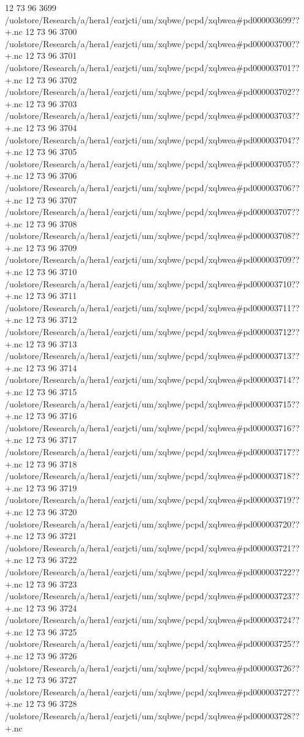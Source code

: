12 73 96
3699
/uolstore/Research/a/hera1/earjcti/um/xqbwe/pcpd/xqbwea#pd000003699??+.nc
12 73 96
3700
/uolstore/Research/a/hera1/earjcti/um/xqbwe/pcpd/xqbwea#pd000003700??+.nc
12 73 96
3701
/uolstore/Research/a/hera1/earjcti/um/xqbwe/pcpd/xqbwea#pd000003701??+.nc
12 73 96
3702
/uolstore/Research/a/hera1/earjcti/um/xqbwe/pcpd/xqbwea#pd000003702??+.nc
12 73 96
3703
/uolstore/Research/a/hera1/earjcti/um/xqbwe/pcpd/xqbwea#pd000003703??+.nc
12 73 96
3704
/uolstore/Research/a/hera1/earjcti/um/xqbwe/pcpd/xqbwea#pd000003704??+.nc
12 73 96
3705
/uolstore/Research/a/hera1/earjcti/um/xqbwe/pcpd/xqbwea#pd000003705??+.nc
12 73 96
3706
/uolstore/Research/a/hera1/earjcti/um/xqbwe/pcpd/xqbwea#pd000003706??+.nc
12 73 96
3707
/uolstore/Research/a/hera1/earjcti/um/xqbwe/pcpd/xqbwea#pd000003707??+.nc
12 73 96
3708
/uolstore/Research/a/hera1/earjcti/um/xqbwe/pcpd/xqbwea#pd000003708??+.nc
12 73 96
3709
/uolstore/Research/a/hera1/earjcti/um/xqbwe/pcpd/xqbwea#pd000003709??+.nc
12 73 96
3710
/uolstore/Research/a/hera1/earjcti/um/xqbwe/pcpd/xqbwea#pd000003710??+.nc
12 73 96
3711
/uolstore/Research/a/hera1/earjcti/um/xqbwe/pcpd/xqbwea#pd000003711??+.nc
12 73 96
3712
/uolstore/Research/a/hera1/earjcti/um/xqbwe/pcpd/xqbwea#pd000003712??+.nc
12 73 96
3713
/uolstore/Research/a/hera1/earjcti/um/xqbwe/pcpd/xqbwea#pd000003713??+.nc
12 73 96
3714
/uolstore/Research/a/hera1/earjcti/um/xqbwe/pcpd/xqbwea#pd000003714??+.nc
12 73 96
3715
/uolstore/Research/a/hera1/earjcti/um/xqbwe/pcpd/xqbwea#pd000003715??+.nc
12 73 96
3716
/uolstore/Research/a/hera1/earjcti/um/xqbwe/pcpd/xqbwea#pd000003716??+.nc
12 73 96
3717
/uolstore/Research/a/hera1/earjcti/um/xqbwe/pcpd/xqbwea#pd000003717??+.nc
12 73 96
3718
/uolstore/Research/a/hera1/earjcti/um/xqbwe/pcpd/xqbwea#pd000003718??+.nc
12 73 96
3719
/uolstore/Research/a/hera1/earjcti/um/xqbwe/pcpd/xqbwea#pd000003719??+.nc
12 73 96
3720
/uolstore/Research/a/hera1/earjcti/um/xqbwe/pcpd/xqbwea#pd000003720??+.nc
12 73 96
3721
/uolstore/Research/a/hera1/earjcti/um/xqbwe/pcpd/xqbwea#pd000003721??+.nc
12 73 96
3722
/uolstore/Research/a/hera1/earjcti/um/xqbwe/pcpd/xqbwea#pd000003722??+.nc
12 73 96
3723
/uolstore/Research/a/hera1/earjcti/um/xqbwe/pcpd/xqbwea#pd000003723??+.nc
12 73 96
3724
/uolstore/Research/a/hera1/earjcti/um/xqbwe/pcpd/xqbwea#pd000003724??+.nc
12 73 96
3725
/uolstore/Research/a/hera1/earjcti/um/xqbwe/pcpd/xqbwea#pd000003725??+.nc
12 73 96
3726
/uolstore/Research/a/hera1/earjcti/um/xqbwe/pcpd/xqbwea#pd000003726??+.nc
12 73 96
3727
/uolstore/Research/a/hera1/earjcti/um/xqbwe/pcpd/xqbwea#pd000003727??+.nc
12 73 96
3728
/uolstore/Research/a/hera1/earjcti/um/xqbwe/pcpd/xqbwea#pd000003728??+.nc
